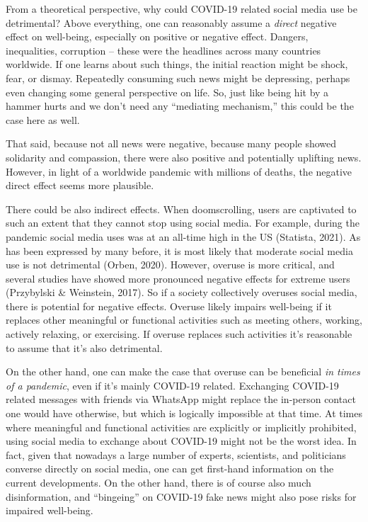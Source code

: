 \documentclass[
  english,
  man,mask,floatsintext]{apa6}
\begin{document}
From a theoretical perspective, why could COVID-19 related social media use be detrimental?
Above everything, one can reasonably assume a \emph{direct} negative effect on well-being, especially on positive or negative effect.
Dangers, inequalities, corruption -- these were the headlines across many countries worldwide.
If one learns about such things, the initial reaction might be shock, fear, or dismay.
Repeatedly consuming such news might be depressing, perhaps even changing some general perspective on life.
So, just like being hit by a hammer hurts and we don't need any ``mediating mechanism,'' this could be the case here as well.

That said, because not all news were negative, because many people showed solidarity and compassion,
there were also positive and potentially uplifting news.
However, in light of a worldwide pandemic with millions of deaths, the negative direct effect seems more plausible.

There could be also indirect effects.
When doomscrolling, users are captivated to such an extent that they cannot stop using social media.
For example, during the pandemic social media uses was at an all-time high in the US (Statista, 2021).
As has been expressed by many before, it is most likely that moderate social media use is not detrimental (Orben, 2020).
However, overuse is more critical, and several studies have showed more pronounced negative effects for extreme users (Przybylski \& Weinstein, 2017).
So if a society collectively overuses social media, there is potential for negative effects.
Overuse likely impairs well-being if it replaces other meaningful or functional activities such as meeting others, working, actively relaxing, or exercising.
If overuse replaces such activities it's reasonable to assume that it's also detrimental.

On the other hand, one can make the case that overuse can be beneficial \emph{in times of a pandemic}, even if it's mainly COVID-19 related.
Exchanging COVID-19 related messages with friends via WhatsApp might replace the in-person contact one would have otherwise, but which is logically impossible at that time.
At times where meaningful and functional activities are explicitly or implicitly prohibited, using social media to exchange about COVID-19 might not be the worst idea.
In fact, given that nowadays a large number of experts, scientists, and politicians converse directly on social media, one can get first-hand information on the current developments.
On the other hand, there is of course also much disinformation, and ``bingeing'' on COVID-19 fake news might also pose risks for impaired well-being.
\end{document}

